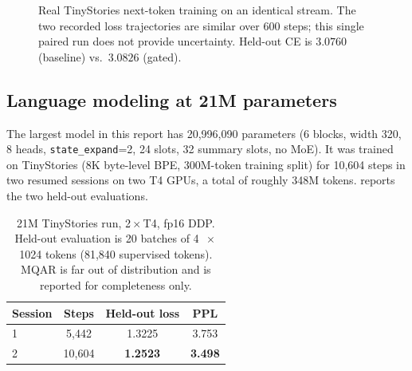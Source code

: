 \begin{figure}[t]
\centering
{}
\caption{Real TinyStories next-token training on an identical stream. The two recorded loss
trajectories are similar over 600 steps; this single paired run does not provide uncertainty.
Held-out CE is $3.0760$ (baseline) vs.\ $3.0826$ (gated).}
\label{fig:lm-check}
\end{figure}

\subsection{Language modeling at 21M parameters}
\label{sec:results-lm}

The largest model in this report has 20{,}996{,}090 parameters (6 blocks, width 320, 8 heads,
\texttt{state\_expand}=2, 24 slots, 32 summary slots, no MoE). It was trained on TinyStories
(8K byte-level BPE, 300M-token training split) for 10{,}604 steps in two resumed sessions on
two T4 GPUs, a total of roughly 348M tokens.  reports the two held-out
evaluations.

\begin{table}[t]
\centering
\caption{21M TinyStories run, 2\,$\times$\,T4, fp16 DDP. Held-out evaluation is 20 batches of
4\,$\,$ $\times$\,1024 tokens (81{,}840 supervised tokens). MQAR is far out of distribution
and is reported for completeness only.}
\label{tab:20m}
\small
\begin{tabular}{@{}l c c c@{}}
\toprule
Session & Steps & Held-out loss & PPL \\
\midrule
1 & 5{,}442 & 1.3225 & 3.753 \\
2 & 10{,}604 & \textbf{1.2523} & \textbf{3.498} \\
\bottomrule
\end{tabular}
\end{table}

